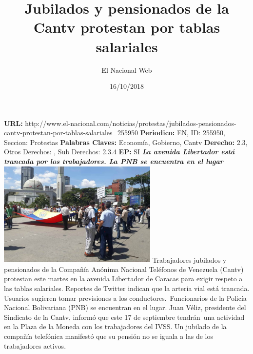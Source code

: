 \documentclass{article}%
\title{\textbf{Jubilados y pensionados de la Cantv protestan por tablas salariales}}%
\author{El Nacional Web}%
\date{16/10/2018}%
\begin{document}
%
\normalsize%
\maketitle%
\textbf{URL: }%
http://www.el{-}nacional.com/noticias/protestas/jubilados{-}pensionados{-}cantv{-}protestan{-}por{-}tablas{-}salariales\_255950\newline%
%
\textbf{Periodico: }%
EN, %
ID: %
255950, %
Seccion: %
Protestas\newline%
%
\textbf{Palabras Claves: }%
Economía, Gobierno, Cantv\newline%
%
\textbf{Derecho: }%
2.3, %
Otros Derechos: %
, %
Sub Derechos: %
2.3.4\newline%
%
\textbf{EP: }%
SI\newline%
\newline%
%
\textbf{\textit{La avenida Libertador está trancada por los trabajadores. La PNB se encuentra en el lugar}}%
\newline%
\newline%
%
\includegraphics[width=300px]{178.jpg}%
\newline%
%
Trabajadores jubilados y pensionados de la Compañía Anónima Nacional Teléfonos de Venezuela (Cantv) protestan este martes en la avenida Libertador de Caracas para exigir respeto a las tablas salariales.%
\newline%
%
Reportes de Twitter indican que la arteria vial está trancada. Usuarios sugieren tomar previsiones a los conductores.~Funcionarios de la Policía Nacional Bolivariana (PNB) se encuentran en el lugar.%
\newline%
%
Juan Véliz, presidente del Sindicato de la Cantv, informó que este 17 de septiembre tendrán~una actividad en la Plaza de la Moneda con los trabajadores del IVSS.%
\newline%
%
Un jubilado de la compañía telefónica manifestó que su pensión no se iguala a las de los trabajadores activos.%
\newline%
%
\end{document}
